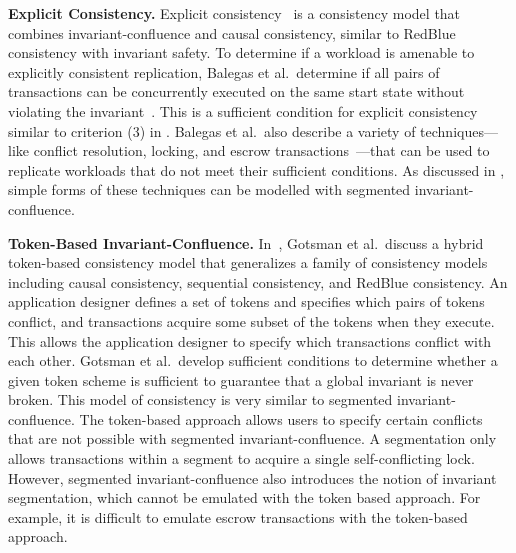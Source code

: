 \textbf{Explicit Consistency.}
Explicit consistency~\cite{balegas2015towards} is a consistency model that
combines invariant-confluence and causal consistency, similar to RedBlue
consistency with invariant safety. To determine if a workload is amenable to
explicitly consistent replication, Balegas et al.\ determine if all pairs of
transactions can be concurrently executed on the same start state without
violating the invariant~\cite{balegas2015towards}.  This is a sufficient
condition for explicit consistency similar to criterion (3) in
. Balegas et al.\ also describe a variety of
techniques---like conflict resolution, locking, and escrow
transactions~\cite{o1986escrow}---that can be used to replicate workloads that
do not meet their sufficient conditions. As discussed in ,
simple forms of these techniques can be modelled with segmented
invariant-confluence.

\textbf{Token-Based Invariant-Confluence.}
In~\cite{gotsman2016cause}, Gotsman et al.\ discuss a hybrid token-based
consistency model that generalizes a family of consistency models including
causal consistency, sequential consistency, and RedBlue consistency. An
application designer defines a set of tokens and specifies which pairs of
tokens conflict, and transactions acquire some subset of the tokens when they
execute. This allows the application designer to specify which transactions
conflict with each other.
%
%
Gotsman et al.\ develop sufficient conditions to determine whether a given
token scheme is sufficient to guarantee that a global invariant is never
broken. This model of consistency is very similar to segmented
invariant-confluence. The token-based approach allows users to specify certain
conflicts that are not possible with segmented invariant-confluence. A
segmentation only allows transactions within a segment to acquire a single
self-conflicting lock. However, segmented invariant-confluence also introduces
the notion of invariant segmentation, which cannot be emulated with the token
based approach. For example, it is difficult to emulate escrow transactions
with the token-based approach.

